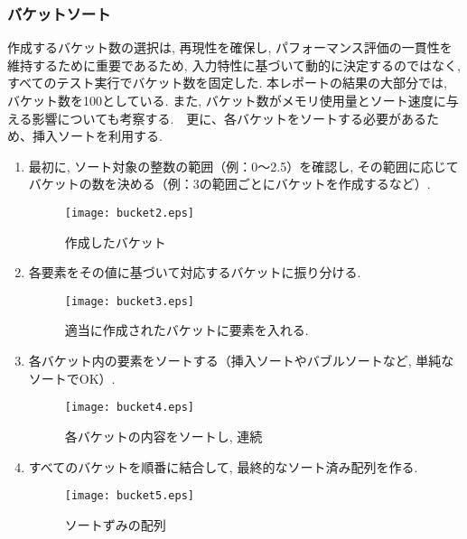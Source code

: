 \documentclass[a4j, 11pt]{jarticle}
\begin{document}
\subsubsection{バケットソート}
作成するバケット数の選択は, 再現性を確保し, パフォーマンス評価の一貫性を維持するために重要であるため, 入力特性に基づいて動的に決定するのではなく, すべてのテスト実行でバケット数を固定した. 本レポートの結果の大部分では, バケット数を100としている. また, バケット数がメモリ使用量とソート速度に与える影響についても考察する.　更に、各バケットをソートする必要があるため、挿入ソートを利用する.\cite{gfg:bucketsort2024}\\
\begin{enumerate}
  \begin{figure}[H]
    \centering
    \texttt{[image: bucket1.eps]}
    \caption{ソート対象データ}
  \end{figure}
  \item 最初に, ソート対象の整数の範囲（例：0〜2.5）を確認し, その範囲に応じてバケットの数を決める（例：3の範囲ごとにバケットを作成するなど）. 
  \begin{figure}[H]
    \centering
    \texttt{[image: bucket2.eps]}
    \caption{作成したバケット}
  \end{figure}
  \item 各要素をその値に基づいて対応するバケットに振り分ける. 
  \begin{figure}[H]
    \centering
    \texttt{[image: bucket3.eps]}
    \caption{適当に作成されたバケットに要素を入れる. }
  \end{figure}
  \newpage
  \item 各バケット内の要素をソートする（挿入ソートやバブルソートなど, 単純なソートでOK）. 
  \begin{figure}[H]
    \centering
    \texttt{[image: bucket4.eps]}
    \caption{各バケットの内容をソートし, 連続}
  \end{figure}
  \item すべてのバケットを順番に結合して, 最終的なソート済み配列を作る. 
  \begin{figure}[H]
    \centering
    \texttt{[image: bucket5.eps]}
    \caption{ソートずみの配列}
  \end{figure}
\end{enumerate}
\end{document}
